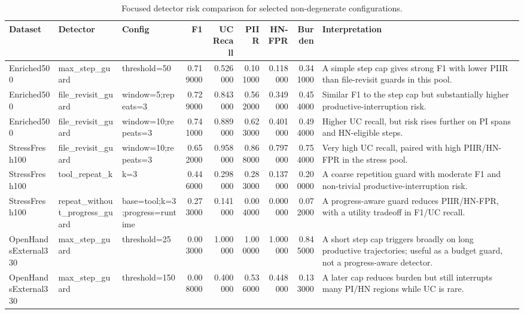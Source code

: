 \begin{table}
\caption{Focused detector risk comparison for selected non-degenerate configurations.}
\label{tab:table3_focused_detector_risk_comparison}
\begin{tabular}{lllrrrrrl}
\toprule
Dataset & Detector & Config & F1 & UC Recall & PIIR & HN-FPR & Burden & Interpretation \\
\midrule
Enriched500 & max\_step\_guard & threshold=50 & 0.719000 & 0.526000 & 0.101000 & 0.118000 & 0.341000 & A simple step cap gives strong F1 with lower PIIR than file-revisit guards in this pool. \\
Enriched500 & file\_revisit\_guard & window=5;repeats=3 & 0.729000 & 0.843000 & 0.562000 & 0.349000 & 0.454000 & Similar F1 to the step cap but substantially higher productive-interruption risk. \\
Enriched500 & file\_revisit\_guard & window=10;repeats=3 & 0.741000 & 0.889000 & 0.623000 & 0.401000 & 0.494000 & Higher UC recall, but risk rises further on PI spans and HN-eligible steps. \\
StressFresh100 & file\_revisit\_guard & window=10;repeats=3 & 0.652000 & 0.958000 & 0.868000 & 0.797000 & 0.754000 & Very high UC recall, paired with high PIIR/HN-FPR in the stress pool. \\
StressFresh100 & tool\_repeat\_k & k=3 & 0.446000 & 0.298000 & 0.283000 & 0.137000 & 0.200000 & A coarse repetition guard with moderate F1 and non-trivial productive-interruption risk. \\
StressFresh100 & repeat\_without\_progress\_guard & base=tool;k=3;progress=runtime & 0.273000 & 0.141000 & 0.004000 & 0.000000 & 0.072000 & A progress-aware guard reduces PIIR/HN-FPR, with a utility tradeoff in F1/UC recall. \\
OpenHandsExternal330 & max\_step\_guard & threshold=25 & 0.003000 & 1.000000 & 1.000000 & 1.000000 & 0.845000 & A short step cap triggers broadly on long productive trajectories; useful as a budget guard, not a progress-aware detector. \\
OpenHandsExternal330 & max\_step\_guard & threshold=150 & 0.008000 & 0.400000 & 0.536000 & 0.448000 & 0.133000 & A later cap reduces burden but still interrupts many PI/HN regions while UC is rare. \\
\bottomrule
\end{tabular}
\end{table}
